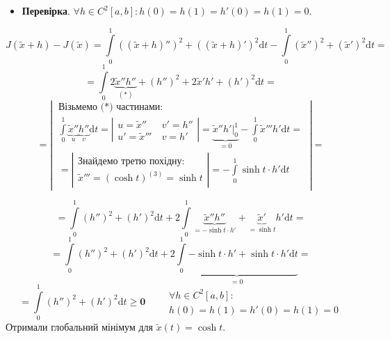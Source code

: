 \documentclass{beamer}
\begin{document}
\begin{frame}
\begin{itemize}
  \item \textbf{Перевірка}. $\forall h \in C^2 [a,b] : h(0) = h(1) = h'(0) = h(1) = 0$.
\end{itemize}
$$
J(\tilde{x} + h) - J(\tilde{x}) =  \int\limits_{0}^{1}{ ((\tilde{x} + h)'')^2 + ((\tilde{x} + h)')^2 \mathrm{d} t} -  \int\limits_{0}^{ 1}{
(\tilde{x}'')^2 + (\tilde{x}')^2 \mathrm{d} t =
}
$$
$$
=  \int\limits_{0}^{1}{
2 \underbrace{\tilde{x}'' h''}_{(*)} + ( h'' )^2 + 2 \tilde{x}' h' + (h')^2 \mathrm{d} t
 } =
$$
$$
=
\left| \
\begin{gathered}
\text{Візьмемо ($*$) частинами:}\\
 \int\limits_{0}^{1}{\underbrace{\tilde{x}''}_{u} \underbrace{h''}_{v} \mathrm{d} t}  = \left| \begin{gathered}
  u =  \tilde{x}'' \\
  u' =  \tilde{x}'''
 \end{gathered} \
\begin{gathered}
 v' = h''\\
 v = h'
\end{gathered}\right|
= \underbrace{\tilde{x}'' h' \bigg|_{0}^{1}}_{=0} -  \int\limits_{0}^{1}{ \tilde{x}''' h' \mathrm{d} t} = \\
= \left| \begin{gathered}
 \text{Знайдемо третю похідну:}\\
 \tilde{x}''' = (\cosh t)^{(3)}  = \sinh t
\end{gathered} \right| = -  \int\limits_{0}^{1}{ \sinh t \cdot h' \mathrm{d} t}
\end{gathered}
   \  \right|=
$$
\end{frame}
\begin{frame}
   $$= \int\limits_{0}^{1}{ (h'')^2 + (h')^2 \mathrm{d} t } + 2  \int\limits_{0}^{1}{ \underbrace{\tilde{x}'' h''}_{=-\sinh t \cdot h'} + \underbrace{\tilde{x}'}_{= \sinh t} h' \mathrm{d} t} = $$
   $$
   = \int\limits_{0}^{1}{ (h'')^2 + (h')^2 \mathrm{d} t } + 2  \underbrace{\int\limits_{0}^{1}{ - \sinh t \cdot h' + \sinh t \cdot h' \mathrm{d} t}}_{=0} =
   $$
   $$ = \int\limits_{0}^{1}{ (h'')^2 + (h')^2 \mathrm{d} t }  \mathbf{\geq 0} \qquad
\begin{gathered}
  \forall h \in C^2 [a,b] :\\
  h(0) = h(1) = h'(0) = h(1) = 0
\end{gathered}
   $$
   Отримали \alert{глобальний мінімум} для $\tilde{x} (t) = \cosh t  $.
\end{frame}
\end{document}
